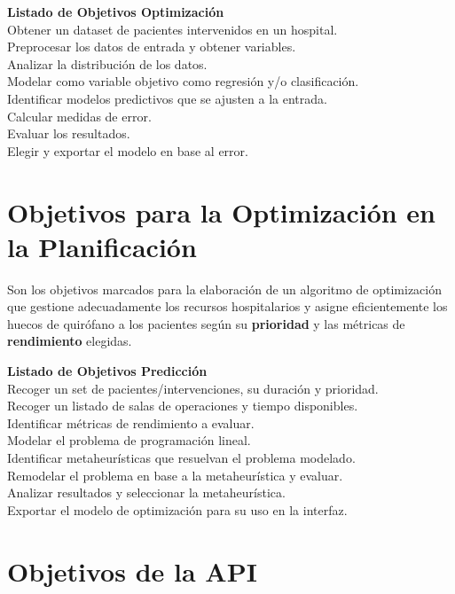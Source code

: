 {\textbf{Listado de Objetivos Optimización}\\}{ 
Obtener un dataset de pacientes intervenidos en un hospital. \\ 
 Preprocesar los datos de entrada y obtener variables. \\ 
 Analizar la distribución de los datos. \\
 Modelar como variable objetivo como regresión y/o clasificación.\\
 Identificar modelos predictivos que se ajusten a la entrada. \\ 
 Calcular medidas de error. \\
 Evaluar los resultados. \\
 Elegir y exportar el modelo en base al error. \\
 } 

\section{Objetivos para la Optimización en la Planificación}

Son los objetivos marcados para la elaboración de un algoritmo de optimización que gestione adecuadamente los recursos hospitalarios y asigne eficientemente los huecos de quirófano a los pacientes según su \textbf{prioridad} y las métricas de \textbf{rendimiento} elegidas.

{\textbf{Listado de Objetivos Predicción}\\}{ 
 Recoger un set de pacientes/intervenciones, su duración y prioridad. \\ 
 Recoger un listado de salas de operaciones y tiempo disponibles. \\ 
 Identificar métricas de rendimiento a evaluar. \\
 Modelar el problema de programación lineal.\\
 Identificar metaheurísticas que resuelvan el problema modelado. \\ 
 Remodelar el problema en base a la metaheurística y evaluar. \\
 Analizar resultados y seleccionar la metaheurística. \\
 Exportar el modelo de optimización para su uso en la interfaz. \\
 } 

\section{ Objetivos de la API}

